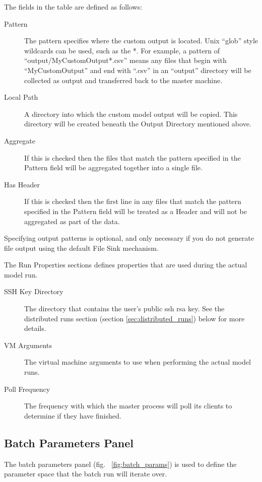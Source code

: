 \documentclass[11pt]{amsart}
\begin{document}
The fields in the table are defined as follows:

\begin{description}
\item[Pattern] The pattern specifies where the custom output is located. Unix ``glob'' style wildcards can be used, such as the *. For example, a pattern of ``output/MyCustomOutput*.csv'' means any files that begin with ``MyCustomOutput'' and end with ``.csv'' in an ``output'' directory will be collected as output and transferred back to the master machine.
\item[Local Path] A directory into which the custom model output will be copied. This directory will be created beneath the Output Directory mentioned above.
\item[Aggregate] If this is checked then the files that match the pattern specified in the Pattern field will be aggregated together into a single file.
\item[Has Header] If this is checked then the first line in any files that match the pattern specified in the Pattern field will be treated as a Header and will not be aggregated as part of the data.
\end{description}

Specifying output patterns is optional, and only necessary if you do not generate file output using the default File Sink mechanism.

The Run Properties sections defines properties that are used during the actual model run. 

\begin{description}
\item[SSH Key Directory] The directory that contains the user's public ssh rsa key. See the distributed runs section (section \ref{sec:distributed_runs}) below for more details.
\item[VM Arguments] The virtual machine arguments to use when performing the actual model runs.
\item[Poll Frequency] The frequency with which the master process will poll its clients to determine if they have finished.\end{description}

\subsection{Batch Parameters Panel}
The batch parameters panel (fig. ~\ref{fig:batch_params})  is used to define the parameter space that the batch run will iterate over. 
\end{document}
